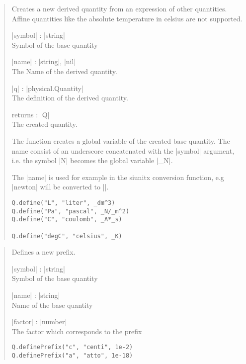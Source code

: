 \documentclass{ltxdoc}
\begin{document}
\begin{quote}
  Creates a new derived quantity from an expression of other quantities. Affine quantities like the absolute temperature in celsius are not supported.

  \begin{description}
  \item |symbol| : |string|\\
  Symbol of the base quantity

  \item |name| : |string|, |nil|\\
    The Name of the derived quantity.

  \item |q| : |physical.Quantity|\\
    The definition of the derived quantity.

  \item returns : |Q|\\
    The created quantity.
  \end{description}

  The function creates a global variable of the created base quantity. The name consist of an underscore concatenated with the |symbol| argument, i.e. the symbol |N| becomes the global variable |_N|.

  The |name| is used for example in the siunitx conversion function, e.g |newton| will be converted to |\newton|. 

  \begin{lstlisting}
Q.define("L", "liter", _dm^3)
Q.define("Pa", "pascal", _N/_m^2)
Q.define("C", "coulomb", _A*_s)

Q.define("degC", "celsius", _K)
  \end{lstlisting}
\end{quote}




\begin{quote}
  Defines a new prefix.

  \begin{description}
  \item |symbol| : |string|\\
    Symbol of the base quantity

  \item |name| : |string|\\
    Name of the base quantity

  \item |factor| : |number|\\
    The factor which corresponds to the prefix
  \end{description}


\begin{lstlisting}
Q.definePrefix("c", "centi", 1e-2)
Q.definePrefix("a", "atto", 1e-18)
\end{lstlisting}
\end{quote}
\end{document}
